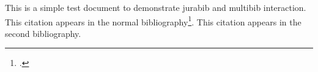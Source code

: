 \documentclass{article}
\begin{document}
This is a simple test document to demonstrate \textsf{jurabib} and \textsf{multibib} interaction.
This citation appears in the normal bibliography\footcite{helm72}.
This citation appears in the second bibliography.




\end{document}
